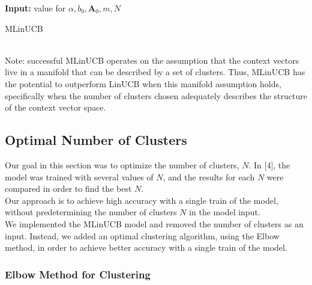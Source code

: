 \documentclass{article}
\begin{document}
\begin{algorithm}[H]
\SetAlgoLined
 \textbf{Input:} value for $\alpha, b_0, \textbf{A}_0, m, N$ \\
    
 \caption{MLinUCB}
\end{algorithm}\\
Note: successful MLinUCB operates on the assumption that the context vectors live in a manifold that can be described by a set of clusters. Thus, MLinUCB has the potential to outperform LinUCB when this manifold assumption
holds, specifically when the number of clusters chosen adequately describes the structure of the
context vector space.\\


\subsection{Optimal Number of Clusters}
Our goal in this section was to optimize the number of clusters, $N$. In [4], the model was trained with several values of $N$, and the results for each $N$ were compared in order to find the best $N$. \\
Our approach is to achieve high accuracy with a single train of the model, without predetermining the number of clusters $N$ in the model input.\\

We implemented the MLinUCB model and removed the number of clusters as an input. Instead, we added an optimal clustering algorithm, using the Elbow method, in order to achieve better accuracy with a single train of the model.\\

\subsubsection{Elbow Method for Clustering}
\end{document}
